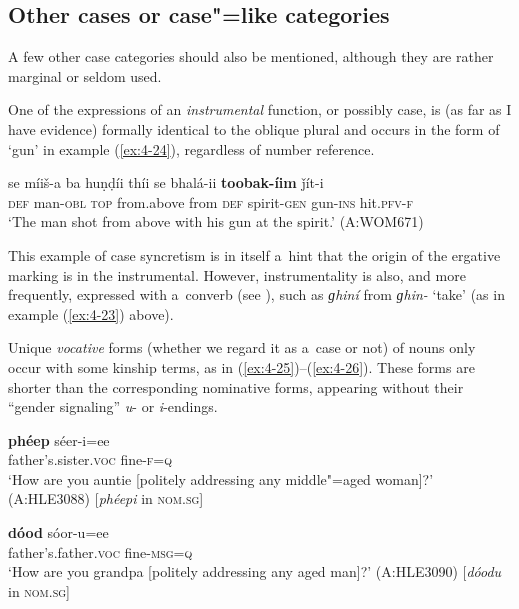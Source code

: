 \subsection{Other cases or case"=like categories}
\label{subsec:4-5-4}

A few other case categories should also be mentioned, although they are rather marginal or seldom used. 


One of the expressions of an \textit{instrumental} function, or possibly case, is (as far as I have evidence) formally identical to the oblique plural and occurs in the form of `gun' in example (\ref{ex:4-24}), regardless of number reference. 


\begin{exe}
\ex
\label{ex:4-24}
\gll se míiš-a ba huṇḍíi thíi se bhalá-ii \textbf{toobak-íim} ǰít-i \\
	\textsc{def} man-\textsc{obl} \textsc{top} from.above from \textsc{def} spirit-\textsc{gen} gun-\textsc{ins} hit.\textsc{pfv-f}\\
\glt `The man shot from above with his gun at the spirit.' (A:WOM671)
\end{exe}

This example of case syncretism is in itself a~hint that the origin of the ergative marking is in the instrumental. However, instrumentality is also, and more frequently, expressed with a~converb (see ), such as \textit{ɡhiní} from \textit{ɡhin-} `take' (as in example (\ref{ex:4-23}) above).


Unique \textit{vocative} forms (whether we regard it as a~case or not) of nouns only occur with some kinship terms, as in (\ref{ex:4-25})--(\ref{ex:4-26}). These forms are shorter than the corresponding nominative forms, appearing without their ``gender signaling'' \textit{u}- or \textit{i}-endings.


\begin{exe}
\ex
\label{ex:4-25}
\gll \textbf{phéep} séer-i=ee \\
	father's.sister.\textsc{voc} fine-\textsc{f=q} \\
\glt `How are you auntie [politely addressing any middle"=aged woman]?' \newline(A:HLE3088) [\textit{phéepi} in \textsc{nom.sg}]
\end{exe}

\begin{exe}
\ex
\label{ex:4-26}
 \gll \textbf{dóod} sóor-u=ee \\
	father's.father.\textsc{voc} fine-\textsc{msg=q} \\
\glt `How are you grandpa [politely addressing any aged man]?' (A:HLE3090) [\textit{dóodu} in \textsc{nom.sg}]
\end{exe}

